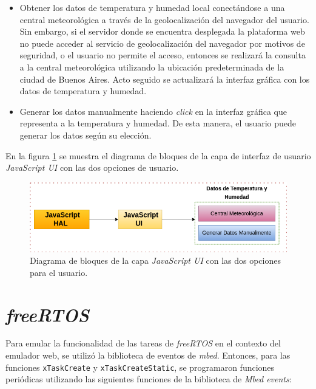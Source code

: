  \begin{itemize}
	\item Obtener los datos de temperatura y humedad local conectándose a una central meteorológica a través de la geolocalización del navegador del usuario. Sin embargo, si el servidor donde se encuentra desplegada la plataforma web no puede acceder al servicio de geolocalización del navegador por motivos de seguridad, o el usuario no permite el acceso, entonces se realizará la consulta a la central meteorológica utilizando la ubicación predeterminada de la ciudad de Buenos Aires. Acto seguido se actualizará la interfaz gráfica con los datos de temperatura y humedad.
	
	\item Generar los datos manualmente haciendo \textit{click} en la interfaz gráfica que representa a la temperatura y humedad. De esta manera, el usuario puede generar los datos según su elección.
\end{itemize}

En la figura \ref{fig:uiDht11} se muestra el diagrama de bloques de la capa de interfaz de usuario \textit{JavaScript UI} con las dos opciones de usuario.

\begin{figure}[ht]
	\centering
	\includegraphics[scale=.53]{./Figures/uiDht11.png}
	\caption{Diagrama de bloques de la capa \textit{JavaScript UI} con las dos opciones para el usuario.}
	\label{fig:uiDht11}
\end{figure}

\section{\textit{freeRTOS}}
\label{sec:freeRTOS}

Para emular la funcionalidad de las tareas de \textit{freeRTOS} en el contexto del emulador web, se utilizó la biblioteca de eventos de \textit{mbed}. Entonces, para las funciones \texttt{xTaskCreate} y \texttt{xTaskCreateStatic}, se programaron funciones periódicas utilizando las siguientes funciones de la biblioteca de \textit{Mbed events}: 

